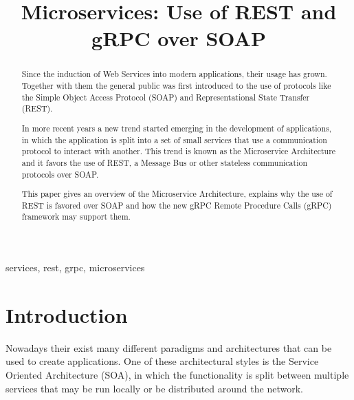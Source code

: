 \documentclass[conference]{IEEEtran}
\begin{document}


\title{Microservices: Use of REST and gRPC over SOAP}

\author{
\and
{}
}

\maketitle

\begin{abstract}

Since the induction of Web Services into modern applications, their usage has grown. Together with them the general public was first introduced to the use of protocols like the Simple Object Access Protocol (SOAP) and Representational State Transfer (REST).

In more recent years a new trend started emerging in the development of applications, in which the application is split into a set of small services that use a communication protocol to interact with another. This trend is known as the Microservice Architecture and it favors the use of REST, a Message Bus or other stateless communication protocols over SOAP.

This paper gives an overview of the Microservice Architecture, explains why the use of REST is favored over SOAP and how the new gRPC Remote Procedure Calls (gRPC) framework may support them.

\end{abstract}

\begin{IEEEkeywords}
services, rest, grpc, microservices
\end{IEEEkeywords}

\section{Introduction}

Nowadays their exist many different paradigms and architectures that can be used to create applications. One of these architectural styles is the Service Oriented Architecture (SOA), in which the functionality is split between multiple services that may be run locally or be distributed around the network.
\end{document}

